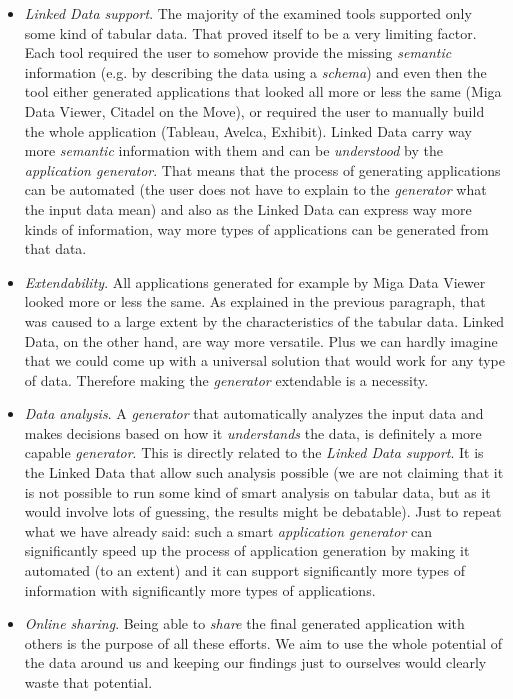 \begin{itemize}
\item \emph{Linked Data support}. The majority of the examined tools supported only some kind of tabular data. That proved itself to be a very limiting factor. Each tool required the user to somehow provide the missing \emph{semantic} information (e.g. by describing the data using a \emph{schema}) and even then the tool either generated applications that looked all more or less the same (Miga Data Viewer, Citadel on the Move),
 or required the user to manually build the whole application (Tableau, Avelca, Exhibit). Linked Data carry way more \emph{semantic} information with them and can be \emph{understood} by the \emph{application generator}. That means that the process of generating applications can be automated (the user does not have to explain to the \emph{generator} what the input data mean) and also as the Linked Data can express way more kinds of information, way more types of applications can be generated from that data.
\item \emph{Extendability}. All applications generated for example by Miga Data Viewer looked more or less the same. As explained in the previous paragraph, that was caused to a large extent by the characteristics of the tabular data. Linked Data, on the other hand, are way more versatile. Plus we can hardly imagine that we could come up with a universal solution that would work for any type of data. Therefore making the \emph{generator} extendable is a necessity.
\item \emph{Data analysis}. A \emph{generator} that automatically analyzes the input data and makes decisions based on how it \emph{understands} the data, is definitely a more capable \emph{generator}. This is directly related to the \emph{Linked Data support}. It is the Linked Data that allow such analysis possible (we are not claiming that it is not possible to run some kind of smart analysis on tabular data, but as it would involve lots of guessing, the results might be debatable). Just to repeat what we have already said: such a smart \emph{application generator} can significantly speed up the process of application generation by making it automated (to an extent) and it can support significantly more types of information with significantly more types of applications.
\item \emph{Online sharing}. Being able to \emph{share} the final generated application with others is the purpose of all these efforts. We aim to use the whole potential of the data around us and keeping our findings just to ourselves would clearly waste that potential.

\end{itemize}
